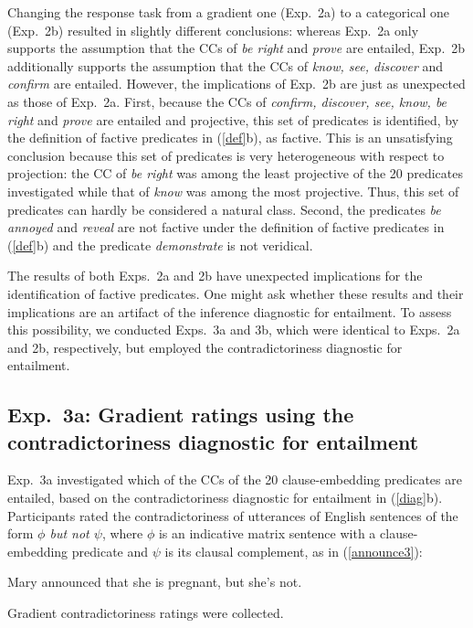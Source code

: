 \documentclass[11pt,fleqn]{article}
\newcommand{\6}{\mbox{$[\hspace*{-.6mm}[$}}
\newcommand{\9}{\mbox{$]\hspace*{-.6mm}]$}}
\begin{document}
Changing the response task from a gradient one (Exp.~2a) to a categorical one (Exp.~2b) resulted in slightly different conclusions: whereas Exp.~2a only supports the assumption that the CCs of {\em be right} and {\em prove} are entailed, Exp.~2b additionally supports the assumption that the CCs of {\em know, see, discover} and {\em confirm} are entailed. However, the implications of Exp.~2b are just as unexpected as those of Exp.~2a. First, because the CCs of {\em confirm, discover, see, know, be right} and {\em prove} are entailed and projective, this set of predicates is identified, by the definition of factive predicates in (\ref{def}b), as factive. This is an unsatisfying conclusion because this set of predicates is very heterogeneous with respect to projection:  the CC of {\em be right} was among the least projective of the 20 predicates investigated while that of {\em know} was among the most projective. Thus, this set of predicates can hardly be considered a natural class. Second, the predicates {\em be annoyed} and {\em reveal} are  not factive under the definition of factive predicates in (\ref{def}b) and the predicate {\em demonstrate} is  not veridical. 

The results of both Exps.~2a and 2b have unexpected implications for the identification of factive predicates. One might ask whether these results and their implications are an artifact of the inference diagnostic for entailment. To assess this possibility, we conducted Exps.~3a and 3b, which were identical to Exps.~2a and 2b, respectively, but employed the contradictoriness diagnostic for entailment.

\subsection{Exp.~3a: Gradient ratings using the contradictoriness diagnostic for entailment}\label{s32}

Exp.~3a investigated which of the CCs of the 20 clause-embedding predicates are entailed, based on the contradictoriness diagnostic for entailment in (\ref{diag}b). Participants rated the contradictoriness of utterances of English sentences of the form {\em $\phi$ but not $\psi$}, where $\phi$ is an indicative matrix sentence with a clause-embedding predicate and $\psi$ is its clausal complement, as in (\ref{announce3}):

\begin{exe}
\ex\label{announce3} Mary announced that she is pregnant, but she's not.
\end{exe}
Gradient contradictoriness ratings were collected.
\end{document}

